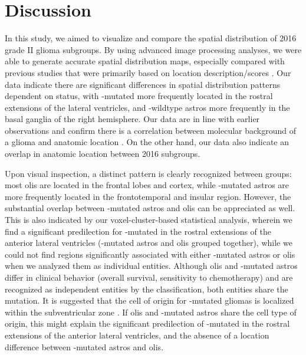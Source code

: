 \section{Discussion}
In this study, we aimed to visualize and compare the spatial distribution of  2016 grade II glioma subgroups.
By using advanced image processing analyses, we were able to generate accurate spatial distribution maps, especially compared with previous studies that were primarily based on location description/scores \autocite{stockhammer2012idh1, goze2009lack, laigle2004correlations, metellus2010absence}.
Our data indicate there are significant differences in spatial distribution patterns dependent on  status, with -mutated  more frequently located in the rostral extensions of the lateral ventricles, and -wildtype \glspl{astro} more frequently in the basal ganglia of the right hemisphere.
Our data are in line with earlier observations and confirm there is a correlation between molecular background of a glioma and anatomic location \autocite{stockhammer2012idh1, goze2009lack, laigle2004correlations, metellus2010absence, tejada2018voxel}.
On the other hand, our data also indicate an overlap in anatomic location between  2016 subgroups.

Upon visual inspection, a distinct pattern is clearly recognized between groups: most \glspl{oli} are located in the frontal lobes and cortex, while -mutated \glspl{astro} are more frequently located in the frontotemporal and insular region.
However, the substantial overlap between -mutated \glspl{astro} and \glspl{oli} can be appreciated as well.
This is also indicated by our voxel-cluster-based statistical analysis, wherein we find a significant predilection for -mutated  in the rostral extensions of the anterior lateral ventricles (-mutated \glspl{astro} and \glspl{oli} grouped together), while we could not find regions significantly associated with either -mutated \glspl{astro} or \glspl{oli} when we analyzed them as individual entities.
Although \glspl{oli} and -mutated \glspl{astro} differ in clinical behavior (overall survival, sensitivity to chemotherapy) and are recognized as independent entities by the  classification, both entities share the  mutation.
It is suggested that the cell of origin for -mutated gliomas is localized within the subventricular zone \autocite{sanai2005neural}.
If \glspl{oli} and -mutated \glspl{astro} share the cell type of origin, this might explain the significant predilection of -mutated  in the rostral extensions of the anterior lateral ventricles, and the absence of a location difference between -mutated \glspl{astro} and \glspl{oli}.

